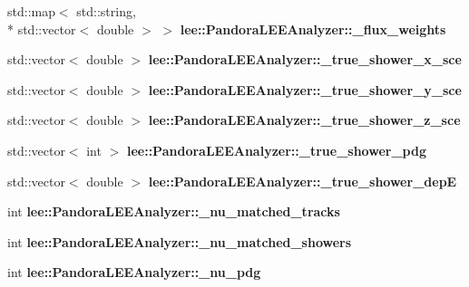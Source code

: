 \begin{DoxyCompactItemize}
\item 
\hypertarget{group__lee_ga5d5ebf6e8ca021c662ee2589ebf13f46}{std\-::map$<$ std\-::string, \\*
std\-::vector$<$ double $>$ $>$ {\bfseries lee\-::\-Pandora\-L\-E\-E\-Analyzer\-::\-\_\-flux\-\_\-weights}}\label{group__lee_ga5d5ebf6e8ca021c662ee2589ebf13f46}

\item 
\hypertarget{group__lee_ga5a4c4d805d124adaddb51a03be0af692}{std\-::vector$<$ double $>$ {\bfseries lee\-::\-Pandora\-L\-E\-E\-Analyzer\-::\-\_\-true\-\_\-shower\-\_\-x\-\_\-sce}}\label{group__lee_ga5a4c4d805d124adaddb51a03be0af692}

\item 
\hypertarget{group__lee_ga2509960b89cf002d160e0c298575eafd}{std\-::vector$<$ double $>$ {\bfseries lee\-::\-Pandora\-L\-E\-E\-Analyzer\-::\-\_\-true\-\_\-shower\-\_\-y\-\_\-sce}}\label{group__lee_ga2509960b89cf002d160e0c298575eafd}

\item 
\hypertarget{group__lee_gacb0f3d491c4acf888d0a787624627b57}{std\-::vector$<$ double $>$ {\bfseries lee\-::\-Pandora\-L\-E\-E\-Analyzer\-::\-\_\-true\-\_\-shower\-\_\-z\-\_\-sce}}\label{group__lee_gacb0f3d491c4acf888d0a787624627b57}

\item 
\hypertarget{group__lee_gac1f312260669f165f847286e4512224d}{std\-::vector$<$ int $>$ {\bfseries lee\-::\-Pandora\-L\-E\-E\-Analyzer\-::\-\_\-true\-\_\-shower\-\_\-pdg}}\label{group__lee_gac1f312260669f165f847286e4512224d}

\item 
\hypertarget{group__lee_ga4f376ec3a74610d2b6e5ea3be722182c}{std\-::vector$<$ double $>$ {\bfseries lee\-::\-Pandora\-L\-E\-E\-Analyzer\-::\-\_\-true\-\_\-shower\-\_\-dep\-E}}\label{group__lee_ga4f376ec3a74610d2b6e5ea3be722182c}

\item 
\hypertarget{group__lee_gae2fc3e074f12a2847d68b4e3192c1151}{int {\bfseries lee\-::\-Pandora\-L\-E\-E\-Analyzer\-::\-\_\-nu\-\_\-matched\-\_\-tracks}}\label{group__lee_gae2fc3e074f12a2847d68b4e3192c1151}

\item 
\hypertarget{group__lee_gab254eacbf12abc1ac43236dfd2f7da16}{int {\bfseries lee\-::\-Pandora\-L\-E\-E\-Analyzer\-::\-\_\-nu\-\_\-matched\-\_\-showers}}\label{group__lee_gab254eacbf12abc1ac43236dfd2f7da16}

\item 
\hypertarget{group__lee_gaf5459aca7400b6346a489d293ffea411}{int {\bfseries lee\-::\-Pandora\-L\-E\-E\-Analyzer\-::\-\_\-nu\-\_\-pdg}}\label{group__lee_gaf5459aca7400b6346a489d293ffea411}


\end{DoxyCompactItemize}
